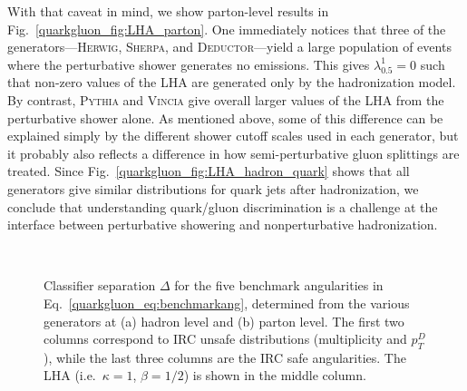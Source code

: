\documentclass[11pt]{cernrep}
\begin{document}
With that caveat in mind, we show parton-level results in Fig.~\ref{quarkgluon_fig:LHA_parton}.  One immediately notices that three of the
generators---\textsc{Herwig}, \textsc{Sherpa}, and
\textsc{Deductor}---yield a large population of events where the
perturbative shower generates no emissions.  This gives
$\lambda_{0.5}^1 = 0$ such that non-zero values of the LHA are
generated only by the hadronization model.  By contrast,
\textsc{Pythia} and \textsc{Vincia} give overall larger values of the
LHA from the perturbative shower alone.  As mentioned above, some of this difference can be explained simply by the different shower cutoff scales used in each generator, but it probably also reflects a difference in how semi-perturbative gluon splittings are treated.  Since Fig.~\ref{quarkgluon_fig:LHA_hadron_quark} shows that all generators give similar distributions for quark jets after hadronization, we
conclude that understanding quark/gluon discrimination is a challenge
at the interface between perturbative showering and nonperturbative
hadronization.

\begin{figure}
\centering
{}
$\qquad$
\caption{Classifier separation $\Delta$ for the five benchmark angularities in Eq.~\eqref{quarkgluon_eq:benchmarkang}, determined from the various generators at (a) hadron level and (b) parton level.  The first two columns correspond to IRC unsafe distributions (multiplicity and $p_T^D$), while the last three columns are the IRC safe angularities.  The LHA (i.e.~$\kappa = 1$, $\beta = 1/2$) is shown in the middle column.}
\label{quarkgluon_fig:summary_all}
\end{figure}
\end{document}
